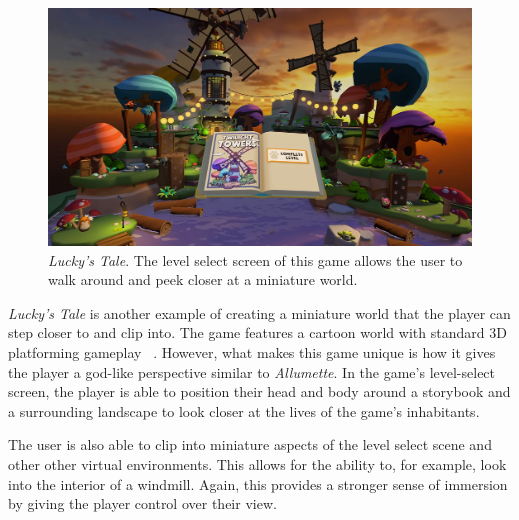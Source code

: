 \documentclass[10pt,twocolumn,letterpaper]{article}
\begin{document}
\begin{figure}[t]
\begin{center}
\includegraphics[width=1.0\linewidth]{images/luckystale.jpg}
\end{center}
   \caption{\textit{Lucky's Tale}.  The level select screen of this game allows the user to walk around and peek closer at a miniature world. }
\label{fig:long}
\label{fig:onecol}
\end{figure}

\textit{Lucky's Tale} is another example of creating a miniature world that the player can step closer to and clip into. The game features a cartoon world with standard 3D platforming gameplay ~\cite{LuckysTale}. However, what makes this game unique is how it gives the player a god-like perspective similar to \textit{Allumette}. In the game's level-select screen, the player is able to position their head and body around a storybook and a surrounding landscape to look closer at the lives of the game's inhabitants.

The user is also able to clip into miniature aspects of the level select scene and other other virtual environments. This allows for the ability to, for example, look into the interior of a windmill. Again, this provides a stronger sense of immersion by giving the player control over their view.\\
\end{document}
